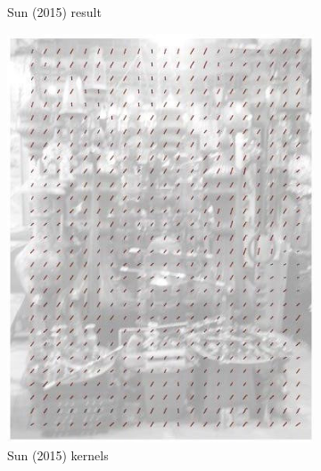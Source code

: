 \documentclass[10pt,twocolumn,letterpaper]{article}
\begin{document}
\begin{figure}
\begin{center}
\begin{subfigure}{0.23\textwidth}
\caption{Sun \etal (2015) result}
\label{fig:subim5}
\end{subfigure}
\begin{subfigure}{0.23\textwidth}
\includegraphics[width=0.9\linewidth]{istanbul_kernels}
\caption{Sun \etal (2015) kernels}
\label{fig:subim7}
\end{subfigure}
\begin{subfigure}{0.23\textwidth}
\graphicspath{ {deblurwhyte/} }

\end{subfigure}
\end{center}
\end{figure}
\end{document}
